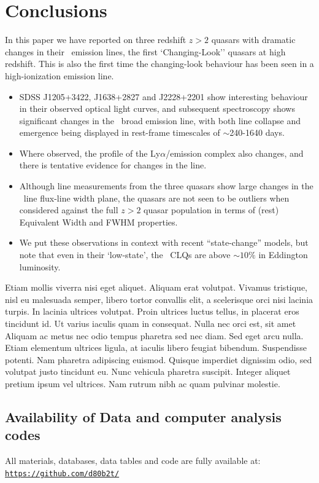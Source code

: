 \documentclass[a4paper,fleqn,usenatbib]{mnras}
\begin{document}
\section{Conclusions}
In this paper we have reported on three redshift $z>2$ quasars with
dramatic changes in their \civ\ emission lines, the first
`Changing-Look'' quasars at high redshift.  This is also the first
time the changing-look behaviour has been seen in a high-ionization
emission line.

\begin{itemize}
  \item {SDSS J1205+3422, J1638+2827 and J2228+2201 show interesting behaviour
in their observed optical light curves, and subsequent spectroscopy
shows significant changes in the \civ\ broad emission line, with both
line collapse and emergence being displayed in rest-frame timescales
of $\sim$240-1640 days.}
\item Where observed, the profile of the Ly$\alpha$/\nv emission complex
also changes, and there is tentative evidence for changes in the \mgii
line.
\item Although line measurements from the three quasars show large changes
in the \civ\ line flux-line width plane, the quasars are not seen to
be outliers when considered against the full $z>2$ quasar population
in terms of (rest) Equivalent Width and FWHM properties.
\item 
We put these observations in context with recent ``state-change''
models, but note that even in their `low-state', the \civ\ CLQs are
above $\sim10\%$ in Eddington luminosity.
\end{itemize}

Etiam mollis viverra nisi eget aliquet. Aliquam erat volutpat. Vivamus
tristique, nisl eu malesuada semper, libero tortor convallis elit, a
scelerisque orci nisi lacinia turpis. In lacinia ultrices
volutpat. Proin ultrices luctus tellus, in placerat eros tincidunt
id. Ut varius iaculis quam in consequat. Nulla nec orci est, sit amet
Aliquam ac metus nec odio tempus pharetra sed nec diam. Sed eget arcu
nulla. Etiam elementum ultrices ligula, at iaculis libero feugiat
bibendum. Suspendisse potenti. Nam pharetra adipiscing
euismod. Quisque imperdiet dignissim odio, sed volutpat justo
tincidunt eu. Nunc vehicula pharetra suscipit. Integer aliquet pretium
ipsum vel ultrices. Nam rutrum nibh ac quam pulvinar molestie.



\subsection*{Availability of Data and computer analysis codes} 
All materials, databases, data tables and code are fully available at: 
\href{https://github.com/d80b2t/VHzQ}{\tt https://github.com/d80b2t/}
\end{document}
